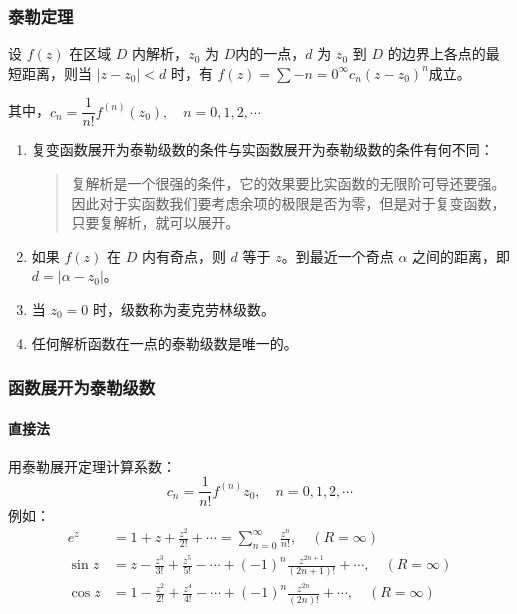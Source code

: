\subsubsection{泰勒定理}
\label{泰勒定理}
设 \(f(z)\) 在区域 \(D\) 内解析，\(z_0\) 为 \(D\)内的一点，\(d\) 为
\(z_0\) 到 \(D\) 的边界上各点的最短距离，则当 \(|z-z_0| < d\) 时，有
\(f(z)=\sum\limits-{n=0}^{\infty}c_n(z-z_0)^n\)成立。

其中，\(c_n = \dfrac{1}{n!}f^{(n)}(z_0),\quad n = 0,1,2,\cdots\)

\begin{tcolorbox}[title={说明},colback=red!5!white
,colframe=red!75!black
,colbacktitle=yellow!50!red
,coltitle=red!25!black, fonttitle=\bfseries,subtitle style={boxrule=0.4pt, colback=yellow!50!red!25!white}]
\begin{enumerate}
\item 复变函数展开为泰勒级数的条件与实函数展开为泰勒级数的条件有何不同：
\begin{quote}
复解析是一个很强的条件，它的效果要比实函数的无限阶可导还要强。因此对于实函数我们要考虑余项的极限是否为零，但是对于复变函数，只要复解析，就可以展开。
\end{quote}
\item 如果 \(f(z)\) 在 \(D\) 内有奇点，则 \(d\) 等于 \(z\)。到最近一个奇点 \(\alpha\) 之间的距离，即 \(d = |\alpha - z_0|\)。
\item 当 \(z_0 = 0\) 时，级数称为麦克劳林级数。
\item 任何解析函数在一点的泰勒级数是唯一的。
\end{enumerate}

\end{tcolorbox}
\subsubsection{函数展开为泰勒级数}
\label{函数展开为泰勒级数}
\paragraph{直接法}
\label{直接法}
用泰勒展开定理计算系数：
\[
c_n = \frac{1}{n!} f^{(n)}z_0,\quad n=0,1,2,\cdots
\]
例如：
\begin{align*}
    e^z &= 1 + z + \frac{z^2}{2!} + \cdots = \sum _{n=0}^{\infty} \frac{z^n}{n!}, \quad (R=\infty)
    \\
    \sin z &= z - \frac{z^3}{3!} + \frac{z^5}{5!} - \cdots + (-1)^n\frac{z^{2n+1}}{(2n+1)!} + \cdots,\quad (R=\infty)
    \\
    \cos z &= 1 - \frac{z^2}{2!} + \frac{z^4}{4!} - \cdots + (-1)^n\frac{z^{2n}}{(2n)!} + \cdots, \quad (R=\infty)
\end{align*}

